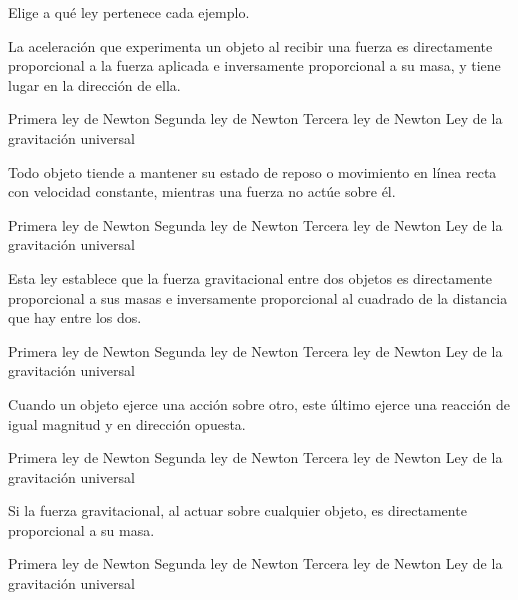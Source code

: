 Elige a qué ley pertenece cada ejemplo.

\begin{parts}

    La aceleración que experimenta un objeto al recibir una fuerza es directamente proporcional a la fuerza aplicada e inversamente proporcional a su masa, y tiene lugar en la dirección de ella.

    \begin{choices}
        \choice Primera ley de Newton
        \choice Segunda ley de Newton
        \choice Tercera ley de Newton
        \choice Ley de la gravitación universal
    \end{choices}

    Todo objeto tiende a mantener su estado de reposo o movimiento en línea recta con velocidad constante, mientras una fuerza no actúe sobre él.

    \begin{choices}
        \choice Primera ley de Newton
        \choice Segunda ley de Newton
        \choice Tercera ley de Newton
        \choice Ley de la gravitación universal
    \end{choices}

    Esta ley establece que la fuerza gravitacional entre dos objetos es directamente proporcional a sus masas e inversamente proporcional al cuadrado de la distancia que hay entre los dos.

    \begin{choices}
        \choice Primera ley de Newton
        \choice Segunda ley de Newton
        \choice Tercera ley de Newton
        \choice Ley de la gravitación universal
    \end{choices}

    Cuando un objeto ejerce una acción sobre otro, este último ejerce una reacción de igual magnitud y en dirección opuesta.

    \begin{choices}
        \choice Primera ley de Newton
        \choice Segunda ley de Newton
        \choice Tercera ley de Newton
        \choice Ley de la gravitación universal
    \end{choices}

    \columnbreak

    Si la fuerza gravitacional, al actuar sobre cualquier objeto, es directamente proporcional a su masa.

    \begin{choices}
        \choice Primera ley de Newton
        \choice Segunda ley de Newton
        \choice Tercera ley de Newton
        \choice Ley de la gravitación universal
    \end{choices}


\end{parts}

